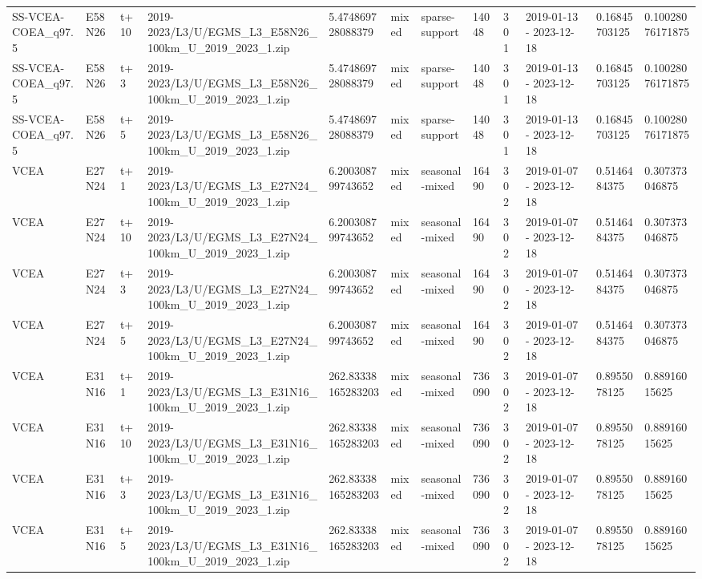 \begin{landscape}
\begin{longtable}{llllllllllll}
SS-VCEA-COEA\_q97.5 & E58N26 & t+10 & 2019-2023/L3/U/EGMS\_L3\_E58N26\_100km\_U\_2019\_2023\_1.zip & 5.474869728088379 & mixed & sparse-support & 14048 & 301 & 2019-01-13 - 2023-12-18 & 0.16845703125 & 0.10028076171875 \\
SS-VCEA-COEA\_q97.5 & E58N26 & t+3 & 2019-2023/L3/U/EGMS\_L3\_E58N26\_100km\_U\_2019\_2023\_1.zip & 5.474869728088379 & mixed & sparse-support & 14048 & 301 & 2019-01-13 - 2023-12-18 & 0.16845703125 & 0.10028076171875 \\
SS-VCEA-COEA\_q97.5 & E58N26 & t+5 & 2019-2023/L3/U/EGMS\_L3\_E58N26\_100km\_U\_2019\_2023\_1.zip & 5.474869728088379 & mixed & sparse-support & 14048 & 301 & 2019-01-13 - 2023-12-18 & 0.16845703125 & 0.10028076171875 \\
VCEA & E27N24 & t+1 & 2019-2023/L3/U/EGMS\_L3\_E27N24\_100km\_U\_2019\_2023\_1.zip & 6.200308799743652 & mixed & seasonal-mixed & 16490 & 302 & 2019-01-07 - 2023-12-18 & 0.5146484375 & 0.307373046875 \\
VCEA & E27N24 & t+10 & 2019-2023/L3/U/EGMS\_L3\_E27N24\_100km\_U\_2019\_2023\_1.zip & 6.200308799743652 & mixed & seasonal-mixed & 16490 & 302 & 2019-01-07 - 2023-12-18 & 0.5146484375 & 0.307373046875 \\
VCEA & E27N24 & t+3 & 2019-2023/L3/U/EGMS\_L3\_E27N24\_100km\_U\_2019\_2023\_1.zip & 6.200308799743652 & mixed & seasonal-mixed & 16490 & 302 & 2019-01-07 - 2023-12-18 & 0.5146484375 & 0.307373046875 \\
VCEA & E27N24 & t+5 & 2019-2023/L3/U/EGMS\_L3\_E27N24\_100km\_U\_2019\_2023\_1.zip & 6.200308799743652 & mixed & seasonal-mixed & 16490 & 302 & 2019-01-07 - 2023-12-18 & 0.5146484375 & 0.307373046875 \\
VCEA & E31N16 & t+1 & 2019-2023/L3/U/EGMS\_L3\_E31N16\_100km\_U\_2019\_2023\_1.zip & 262.83338165283203 & mixed & seasonal-mixed & 736090 & 302 & 2019-01-07 - 2023-12-18 & 0.8955078125 & 0.88916015625 \\
VCEA & E31N16 & t+10 & 2019-2023/L3/U/EGMS\_L3\_E31N16\_100km\_U\_2019\_2023\_1.zip & 262.83338165283203 & mixed & seasonal-mixed & 736090 & 302 & 2019-01-07 - 2023-12-18 & 0.8955078125 & 0.88916015625 \\
VCEA & E31N16 & t+3 & 2019-2023/L3/U/EGMS\_L3\_E31N16\_100km\_U\_2019\_2023\_1.zip & 262.83338165283203 & mixed & seasonal-mixed & 736090 & 302 & 2019-01-07 - 2023-12-18 & 0.8955078125 & 0.88916015625 \\
VCEA & E31N16 & t+5 & 2019-2023/L3/U/EGMS\_L3\_E31N16\_100km\_U\_2019\_2023\_1.zip & 262.83338165283203 & mixed & seasonal-mixed & 736090 & 302 & 2019-01-07 - 2023-12-18 & 0.8955078125 & 0.88916015625 \\

\end{longtable}
\end{landscape}
